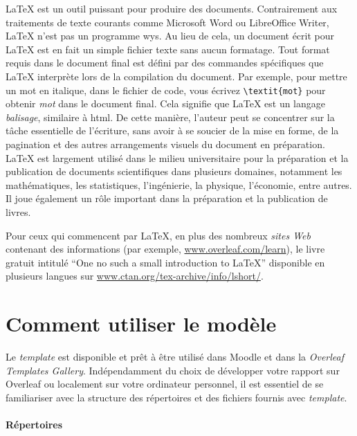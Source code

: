 \LaTeX{} est un outil puissant pour produire des documents. Contrairement aux traitements de texte courants comme Microsoft Word ou LibreOffice Writer, \LaTeX{} n'est pas un programme \ac{wys}. Au lieu de cela, un document écrit pour \LaTeX{} est en fait un simple fichier texte sans aucun formatage. Tout format requis dans le document final est défini par des commandes spécifiques que \LaTeX{} interprète lors de la compilation du document. Par exemple, pour mettre un mot en italique, dans le fichier de code, vous écrivez \verb|\textit{mot}| pour obtenir \textit{mot} dans le document final. Cela signifie que \LaTeX{} est un langage \emph{balisage}, similaire à \ac{html}. De cette manière, l'auteur peut se concentrer sur la tâche essentielle de l'écriture, sans avoir à se soucier de la mise en forme, de la pagination et des autres arrangements visuels du document en préparation. \LaTeX{} est largement utilisé dans le milieu universitaire pour la préparation et la publication de documents scientifiques dans plusieurs domaines, notamment les mathématiques, les statistiques, l'ingénierie, la physique, l'économie, entre autres. Il joue également un rôle important dans la préparation et la publication de livres.

Pour ceux qui commencent par \LaTeX{}, en plus des nombreux \textit{sites Web} contenant des informations (par exemple, \url{www.overleaf.com/learn}), le livre gratuit intitulé ``One no such a small introduction to \LaTeX{}'' disponible en plusieurs langues sur \url{www.ctan.org/tex-archive/info/lshort/}.


\section{Comment utiliser le modèle}

Le \textit{template} est disponible et prêt à être utilisé dans Moodle et dans la \textit{Overleaf Templates Gallery}. Indépendamment du choix de développer votre rapport sur Overleaf ou localement sur votre ordinateur personnel, il est essentiel de se familiariser avec la structure des répertoires et des fichiers fournis avec \textit{template}.

\paragraph{Répertoires}

